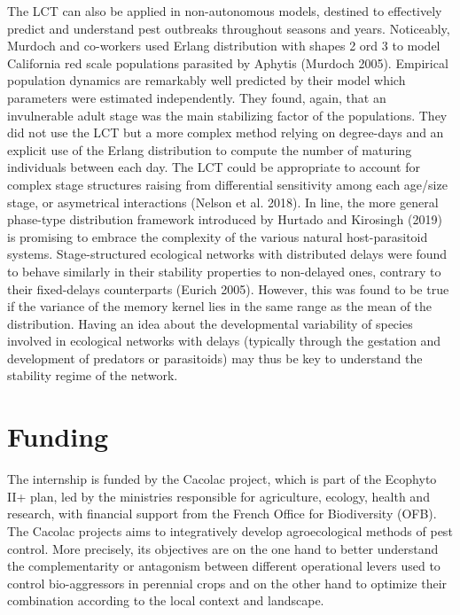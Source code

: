 \documentclass[12pt,a4paper,onecolumn]{article}
\begin{document}
\tabto{1 cm} The LCT can also be applied in non-autonomous models, destined to effectively predict and understand pest outbreaks throughout seasons and years. Noticeably, Murdoch and co-workers used Erlang distribution with shapes 2 ord 3 to model California red scale populations parasited by Aphytis (Murdoch 2005). Empirical population dynamics are remarkably well predicted by their model which parameters were estimated independently. They found, again, that an invulnerable adult stage was the main stabilizing factor of the populations. They did not use the LCT but a more complex method relying on degree-days and an explicit use of the Erlang distribution to compute the number of maturing individuals between each day. 
\tabto{1 cm} The LCT could be appropriate to account for complex stage structures raising from differential sensitivity among each age/size stage, or asymetrical interactions (Nelson et al. 2018). In line, the more general phase-type distribution framework introduced by Hurtado and Kirosingh (2019) is promising to embrace the complexity of the various natural host-parasitoid systems. 
\tabto{1 cm} Stage-structured ecological networks with distributed delays were found to behave similarly in their stability properties to non-delayed ones, contrary to their fixed-delays counterparts (Eurich 2005). However, this was found to be true if the variance of the memory kernel lies in the same range as the mean of the distribution. Having an idea about the developmental variability of species involved in ecological networks with delays (typically through the gestation and development of predators or parasitoids) may thus be key to understand the stability regime of the network.

\section{Funding}
The internship is funded by the Cacolac project, which is part of the Ecophyto II+ plan, led by the ministries responsible for agriculture, ecology, health and research, with financial support from the French Office for Biodiversity (OFB). The Cacolac projects aims  to integratively develop agroecological methods of pest control. More precisely, its objectives are on the one hand to better understand the complementarity or antagonism between different operational levers used to control bio-aggressors in perennial crops and on the other hand to optimize their combination according to the local context and landscape.
\end{document}
